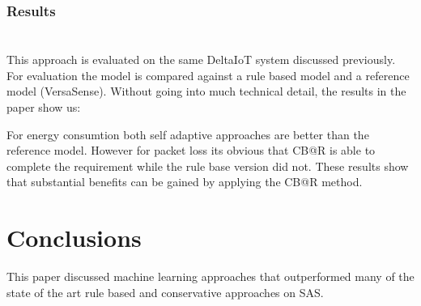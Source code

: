 \documentclass[pdftex,english,oribibl]{llncs}
\begin{document}
\subsubsection{Results \\\\}
This approach is evaluated on the same DeltaIoT system discussed previously. For evaluation the model is compared against a rule based model and a reference model (VersaSense). Without going into much technical detail, the results in the paper show us:
 \begin{figure}[H]
\centering
{}
\end{figure}
	
For energy consumtion both self adaptive approaches are better than the reference model. However for packet loss its obvious that CB@R is able to complete the requirement while the rule base version did not. These results show that substantial benefits can be gained by applying the CB@R method. 

\section{Conclusions}\label{sec:conclusions}
This paper discussed machine learning approaches that outperformed many of the state of the art rule based and conservative approaches on SAS.
\end{document}
